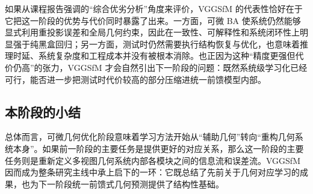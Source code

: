 如果从课程报告强调的“综合优劣分析”角度来评价，VGGSfM 的代表性恰好在于它把这一阶段的优势与代价同时暴露了出来。一方面，可微 BA 使系统仍然能够显式利用重投影误差和全局几何约束，因此在一致性、可解释性和系统闭环性上明显强于纯黑盒回归；另一方面，测试时仍然需要执行结构恢复与优化，也意味着推理时延、系统复杂度和工程成本并没有被根本消除。也正因为这种“精度更强但代价仍高”的张力，VGGSfM 才会自然引出下一阶段的问题：既然系统级学习化已经可行，能否进一步把测试时代价较高的部分压缩进统一前馈模型内部。

\subsection{本阶段的小结}

总体而言，可微几何优化阶段意味着学习方法开始从“辅助几何”转向“重构几何系统本身”。如果前一阶段的主要任务是提供更好的对应关系，那么这一阶段的主要任务则是重新定义多视图几何系统内部各模块之间的信息流和误差流。VGGSfM 因而成为整条研究主线中承上启下的一环：它既总结了先前关于几何对应学习的成果，也为下一阶段统一前馈式几何预测提供了结构性基础。
